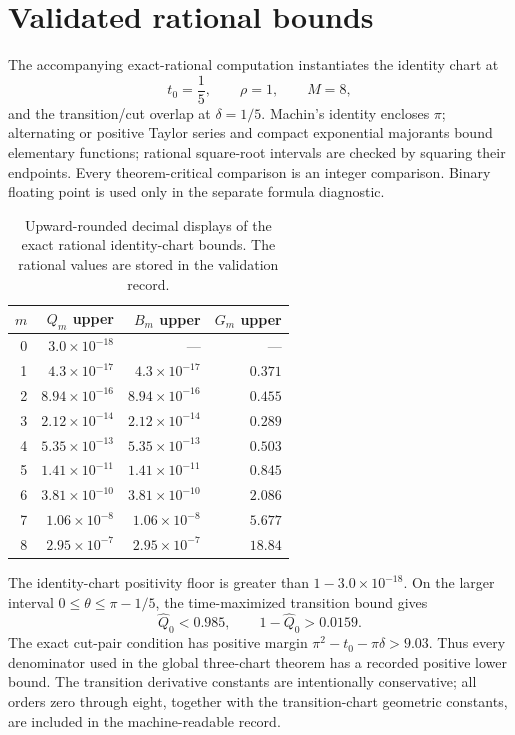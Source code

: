 \section{Validated rational bounds}\label{sec:certificate}

The accompanying exact-rational computation instantiates the identity chart
at
\[
 t_0=\frac15,\qquad \rho=1,\qquad M=8,
\]
and the transition/cut overlap at $\delta=1/5$.  Machin's identity encloses
$\pi$; alternating or positive Taylor series and compact exponential
majorants bound elementary functions; rational square-root intervals are
checked by squaring their endpoints.  Every theorem-critical comparison is
an integer comparison.  Binary floating point is used only in the separate
formula diagnostic.

\begin{table}[ht]
\centering
\small
\begin{tabular}{rrrr}
\toprule
$m$ & $Q_m$ upper & $B_m$ upper & $G_m$ upper \\
\midrule
0 & $3.0\!\times\!10^{-18}$ & --- & --- \\
1 & $4.3\!\times\!10^{-17}$ & $4.3\!\times\!10^{-17}$ & $0.371$ \\
2 & $8.94\!\times\!10^{-16}$ & $8.94\!\times\!10^{-16}$ & $0.455$ \\
3 & $2.12\!\times\!10^{-14}$ & $2.12\!\times\!10^{-14}$ & $0.289$ \\
4 & $5.35\!\times\!10^{-13}$ & $5.35\!\times\!10^{-13}$ & $0.503$ \\
5 & $1.41\!\times\!10^{-11}$ & $1.41\!\times\!10^{-11}$ & $0.845$ \\
6 & $3.81\!\times\!10^{-10}$ & $3.81\!\times\!10^{-10}$ & $2.086$ \\
7 & $1.06\!\times\!10^{-8}$ & $1.06\!\times\!10^{-8}$ & $5.677$ \\
8 & $2.95\!\times\!10^{-7}$ & $2.95\!\times\!10^{-7}$ & $18.84$ \\
\bottomrule
\end{tabular}
\caption{Upward-rounded decimal displays of the exact rational identity-chart
bounds.  The rational values are stored in the validation record.}
\label{tab:certificate}
\end{table}

The identity-chart positivity floor is greater than
$1-3.0\times10^{-18}$.  On the larger interval
$0\le\theta\le\pi-1/5$, the time-maximized transition bound gives
\[
 \widehat Q_0<0.985,\qquad 1-\widehat Q_0>0.0159.
\]
The exact cut-pair condition has positive margin
$\pi^2-t_0-\pi\delta>9.03$.  Thus every denominator used in the global
three-chart theorem has a recorded positive lower bound.  The transition
derivative constants are intentionally conservative; all orders zero through
eight, together with the transition-chart geometric constants, are included
in the machine-readable record.

